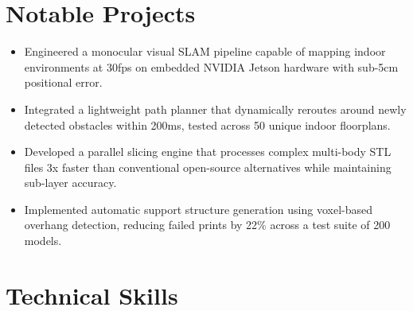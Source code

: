 \documentclass{slate-resume}
\begin{document}
\section{Notable Projects}
\begin{entryblock}
\begin{itemize}
  \item Engineered a monocular visual SLAM pipeline capable of mapping indoor environments at 30fps on embedded NVIDIA Jetson hardware with sub-5cm positional error.
  \item Integrated a lightweight path planner that dynamically reroutes around newly detected obstacles within 200ms, tested across 50 unique indoor floorplans.
\end{itemize}
\end{entryblock}
\entrygap
\begin{entryblock}
\begin{itemize}
  \item Developed a parallel slicing engine that processes complex multi-body STL files 3x faster than conventional open-source alternatives while maintaining sub-layer accuracy.
  \item Implemented automatic support structure generation using voxel-based overhang detection, reducing failed prints by 22\% across a test suite of 200 models.
\end{itemize}
\end{entryblock}



\section{Technical Skills}
\begin{entryblock}
\end{entryblock}
\end{document}
